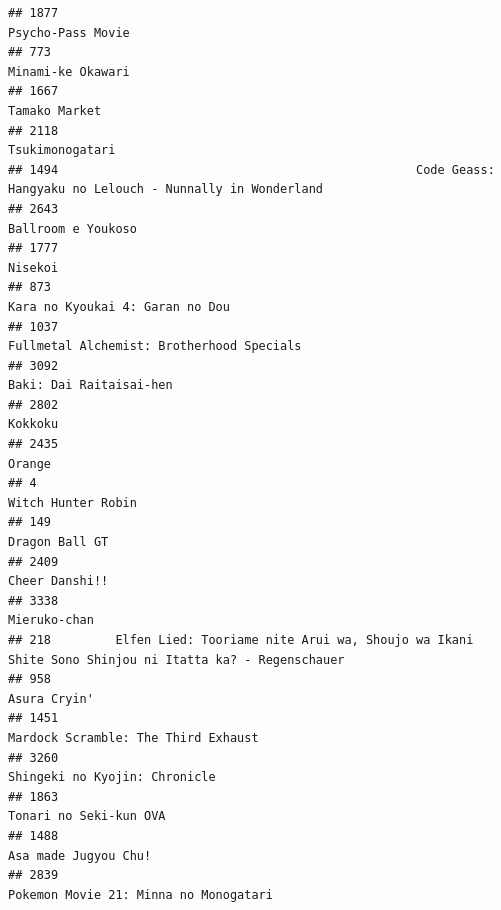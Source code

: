 \documentclass[
]{article}
\begin{document}
\begin{verbatim}
## 1877                                                                                         Psycho-Pass Movie
## 773                                                                                          Minami-ke Okawari
## 1667                                                                                             Tamako Market
## 2118                                                                                           Tsukimonogatari
## 1494                                                  Code Geass: Hangyaku no Lelouch - Nunnally in Wonderland
## 2643                                                                                        Ballroom e Youkoso
## 1777                                                                                                   Nisekoi
## 873                                                                            Kara no Kyoukai 4: Garan no Dou
## 1037                                                                 Fullmetal Alchemist: Brotherhood Specials
## 3092                                                                                   Baki: Dai Raitaisai-hen
## 2802                                                                                                   Kokkoku
## 2435                                                                                                    Orange
## 4                                                                                           Witch Hunter Robin
## 149                                                                                             Dragon Ball GT
## 2409                                                                                            Cheer Danshi!!
## 3338                                                                                              Mieruko-chan
## 218         Elfen Lied: Tooriame nite Arui wa, Shoujo wa Ikani Shite Sono Shinjou ni Itatta ka? - Regenschauer
## 958                                                                                               Asura Cryin'
## 1451                                                                       Mardock Scramble: The Third Exhaust
## 3260                                                                             Shingeki no Kyojin: Chronicle
## 1863                                                                                    Tonari no Seki-kun OVA
## 1488                                                                                      Asa made Jugyou Chu!
## 2839                                                                     Pokemon Movie 21: Minna no Monogatari

\end{verbatim}
\end{document}
